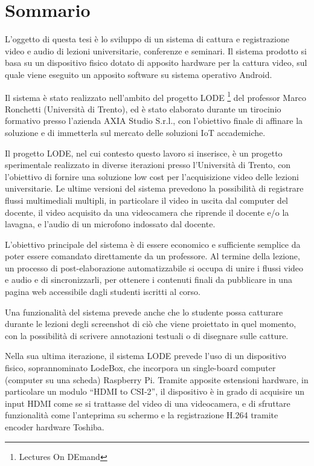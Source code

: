 \chapter*{Sommario} %
\label{sommario}


L'oggetto di questa tesi è lo sviluppo di un sistema di cattura e registrazione video e audio di lezioni universitarie, conferenze e seminari. Il sistema prodotto si basa su un dispositivo fisico dotato di apposito hardware per la cattura video, sul quale viene eseguito un apposito software su sistema operativo Android.

Il sistema è stato realizzato nell'ambito del progetto LODE \footnote{Lectures On DEmand} del professor Marco Ronchetti (Università di Trento), ed è stato elaborato durante un tirocinio formativo presso l'azienda AXIA Studio S.r.l., con l'obiettivo finale di affinare la soluzione e di immetterla sul mercato delle soluzioni IoT accademiche.

Il progetto LODE, nel cui contesto questo lavoro si inserisce, è un progetto sperimentale realizzato in diverse iterazioni presso l'Università di Trento, con l'obiettivo di fornire una soluzione low cost per l'acquisizione video delle lezioni universitarie. Le ultime versioni del sistema prevedono la possibilità di registrare flussi multimediali multipli, in particolare il video in uscita dal computer del docente, il video acquisito da una videocamera che riprende il docente e/o la lavagna, e l'audio di un microfono indossato dal docente.

L'obiettivo principale del sistema è di essere economico e sufficiente semplice da poter essere comandato direttamente da un professore. Al termine della lezione, un processo di post-elaborazione automatizzabile si occupa di unire i flussi video e audio e di sincronizzarli, per ottenere i contenuti finali da pubblicare in una pagina web accessibile dagli studenti iscritti al corso.

Una funzionalità del sistema prevede anche che lo studente possa catturare durante le lezioni degli screenshot di ciò che viene proiettato in quel momento, con la possibilità di scrivere annotazioni testuali o di disegnare sulle catture.

Nella sua ultima iterazione, il sistema LODE prevede l'uso di un dispositivo fisico, soprannominato LodeBox, che incorpora un single-board computer (computer su una scheda) Raspberry Pi. Tramite apposite estensioni hardware, in particolare un modulo “HDMI to CSI-2”, il dispositivo è in grado di acquisire un input HDMI come se si trattasse del video di una videocamera, e di sfruttare funzionalità come l'anteprima su schermo e la registrazione H.264 tramite encoder hardware Toshiba.

